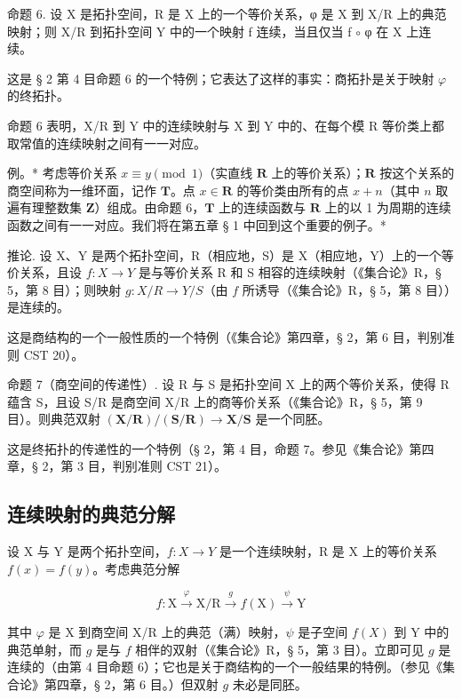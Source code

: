 命题 6. 设 X 是拓扑空间，R 是 X 上的一个等价关系，φ 是 X 到 X/R 上的典范映射；则 X/R 到拓扑空间 Y 中的一个映射 f 连续，当且仅当 f \(\circ\) φ 在 X 上连续。

这是 § 2 第 4 目命题 6 的一个特例；它表达了这样的事实：商拓扑是关于映射 \(\varphi\) 的终拓扑。

命题 6 表明，X/R 到 Y 中的连续映射与 X 到 Y 中的、在每个模 R 等价类上都取常值的连续映射之间有一一对应。

例。* 考虑等价关系 \(x \equiv y \pmod{1}\)（实直线 \(\mathbf{R}\) 上的等价关系）；\(\mathbf{R}\) 按这个关系的商空间称为一维环面，记作 \(\mathbf{T}\)。点 \(x \in \mathbf{R}\) 的等价类由所有的点 \(x + n\)（其中 \(n\) 取遍有理整数集 \(\mathbf{Z}\)）组成。由命题 6，\(\mathbf{T}\) 上的连续函数与 \(\mathbf{R}\) 上的以 1 为周期的连续函数之间有一一对应。我们将在第五章 § 1 中回到这个重要的例子。*

推论. 设 X、Y 是两个拓扑空间，R（相应地，S）是 X（相应地，Y）上的一个等价关系，且设 \(f: X \to Y\) 是与等价关系 R 和 S 相容的连续映射（《集合论》R，§ 5，第 8 目）；则映射 \(g: X/R \to Y/S\)（由 \(f\) 所诱导（《集合论》R，§ 5，第 8 目））是连续的。

这是商结构的一个一般性质的一个特例（《集合论》第四章，§ 2，第 6 目，判别准则 CST 20）。

命题 7（商空间的传递性）. 设 R 与 S 是拓扑空间 X 上的两个等价关系，使得 R 蕴含 S，且设 S/R 是商空间 X/R 上的商等价关系（《集合论》R，§ 5，第 9 目）。则典范双射 \((\mathbf{X}/\mathbf{R})/(\mathbf{S}/\mathbf{R}) \to \mathbf{X}/\mathbf{S}\) 是一个同胚。

这是终拓扑的传递性的一个特例（§ 2，第 4 目，命题 7。参见《集合论》第四章，§ 2，第 3 目，判别准则 CST 21）。

\subsection{连续映射的典范分解}

设 X 与 Y 是两个拓扑空间，\(f: X \rightarrow Y\) 是一个连续映射，R 是 X 上的等价关系 \(f(x) = f(y)\)。考虑典范分解

\[
f: \mathrm{X} \xrightarrow {\varphi} \mathrm{X} / \mathrm{R} \xrightarrow {g} f (\mathrm{X}) \xrightarrow {\psi} \mathrm{Y}
\]

其中 \(\varphi\) 是 X 到商空间 X/R 上的典范（满）映射，\(\psi\) 是子空间 \(f(X)\) 到 Y 中的典范单射，而 \(g\) 是与 \(f\) 相伴的双射（《集合论》R，§ 5，第 3 目）。立即可见 \(g\) 是连续的（由第 4 目命题 6）；它也是关于商结构的一个一般结果的特例。（参见《集合论》第四章，§ 2，第 6 目。）但双射 \(g\) 未必是同胚。

